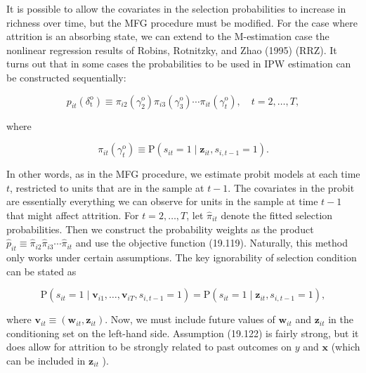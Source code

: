 \documentclass[10pt]{article}
\begin{document}
It is possible to allow the covariates in the selection probabilities to increase in richness over time, but the MFG procedure must be modified. For the case where attrition is an absorbing state, we can extend to the M-estimation case the nonlinear regression results of Robins, Rotnitzky, and Zhao (1995) (RRZ). It turns out that in some cases the probabilities to be used in IPW estimation can be constructed sequentially:


\begin{equation*}
p_{i t}\left(\delta_{\mathrm{t}}^{\mathrm{o}}\right) \equiv \pi_{i 2}\left(\gamma_{2}^{\mathrm{o}}\right) \pi_{i 3}\left(\gamma_{3}^{\mathrm{o}}\right) \cdots \pi_{i t}\left(\gamma_{t}^{\mathrm{o}}\right), \quad t=2, \ldots, T, \tag{19.120}
\end{equation*}


where


\begin{equation*}
\pi_{i t}\left(\gamma_{t}^{\mathrm{o}}\right) \equiv \mathrm{P}\left(s_{i t}=1 \mid \mathbf{z}_{i t}, s_{i, t-1}=1\right) . \tag{19.121}
\end{equation*}


In other words, as in the MFG procedure, we estimate probit models at each time $t$, restricted to units that are in the sample at $t-1$. The covariates in the probit are essentially everything we can observe for units in the sample at time $t-1$ that might affect attrition. For $t=2, \ldots, T$, let $\hat{\pi}_{i t}$ denote the fitted selection probabilities. Then we construct the probability weights as the product $\hat{p}_{i t} \equiv \hat{\pi}_{i 2} \hat{\pi}_{i 3} \cdots \hat{\pi}_{i t}$ and use the objective function (19.119). Naturally, this method only works under certain assumptions. The key ignorability of selection condition can be stated as


\begin{equation*}
\mathrm{P}\left(s_{i t}=1 \mid \mathbf{v}_{i 1}, \ldots, \mathbf{v}_{i T}, s_{i, t-1}=1\right)=\mathrm{P}\left(s_{i t}=1 \mid \mathbf{z}_{i t}, s_{i, t-1}=1\right), \tag{19.122}
\end{equation*}


where $\mathbf{v}_{i t} \equiv\left(\mathbf{w}_{i t}, \mathbf{z}_{i t}\right)$. Now, we must include future values of $\mathbf{w}_{i t}$ and $\mathbf{z}_{i t}$ in the conditioning set on the left-hand side. Assumption (19.122) is fairly strong, but it does allow for attrition to be strongly related to past outcomes on $y$ and $\mathbf{x}$ (which can be included in $\mathbf{z}_{i t}$ ).
\end{document}
